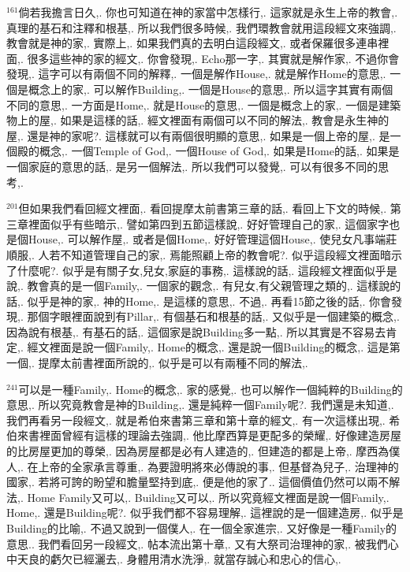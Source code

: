\documentclass{book}
\begin{document}
$^{161}$倘若我擔言日久,.
你也可知道在神的家當中怎樣行,.
這家就是永生上帝的教會,.
真理的基石和注釋和根基,.
所以我們很多時候,.
我們環教會就用這段經文來強調,.
教會就是神的家,.
實際上,.
如果我們真的去明白這段經文,.
或者保羅很多連串裡面,.
很多這些神的家的經文,.
你會發現,.
Echo那一字,.
其實就是解作家,.
不過你會發現,.
這字可以有兩個不同的解釋,.
一個是解作House,.
就是解作Home的意思,.
一個是概念上的家,.
可以解作Building,.
一個是House的意思,.
所以這字其實有兩個不同的意思,.
一方面是Home,.
就是House的意思,.
一個是概念上的家,.
一個是建築物上的屋,.
如果是這樣的話,.
經文裡面有兩個可以不同的解法,.
教會是永生神的屋,.
還是神的家呢?.
這樣就可以有兩個很明顯的意思,.
如果是一個上帝的屋,.
是一個殿的概念,.
一個Temple of God,.
一個House of God,.
如果是Home的話,.
如果是一個家庭的意思的話,.
是另一個解法,.
所以我們可以發覺,.
可以有很多不同的思考,.

$^{201}$但如果我們看回經文裡面,.
看回提摩太前書第三章的話,.
看回上下文的時候,.
第三章裡面似乎有些暗示,.
譬如第四到五節這樣說,.
好好管理自己的家,.
這個家字也是個House,.
可以解作屋,.
或者是個Home,.
好好管理這個House,.
使兒女凡事端莊順服,.
人若不知道管理自己的家,.
焉能照顧上帝的教會呢?.
似乎這段經文裡面暗示了什麼呢?.
似乎是有關子女,兒女,家庭的事務,.
這樣說的話,.
這段經文裡面似乎是說,.
教會真的是一個Family,.
一個家的觀念,.
有兒女,有父親管理之類的,.
這樣說的話,.
似乎是神的家,.
神的Home,.
是這樣的意思,.
不過,.
再看15節之後的話,.
你會發現,.
那個字眼裡面說到有Pillar,.
有個基石和根基的話,.
又似乎是一個建築的概念,.
因為說有根基,.
有基石的話,.
這個家是說Building多一點,.
所以其實是不容易去肯定,.
經文裡面是說一個Family,.
Home的概念,.
還是說一個Building的概念,.
這是第一個,.
提摩太前書裡面所說的,.
似乎是可以有兩種不同的解法,.

$^{241}$可以是一種Family,.
Home的概念,.
家的感覺,.
也可以解作一個純粹的Building的意思,.
所以究竟教會是神的Building,.
還是純粹一個Family呢?.
我們還是未知道,.
我們再看另一段經文,.
就是希伯來書第三章和第十章的經文,.
有一次這樣出現,.
希伯來書裡面曾經有這樣的理論去強調,.
他比摩西算是更配多的榮耀,.
好像建造房屋的比房屋更加的尊榮,.
因為房屋都是必有人建造的,.
但建造的都是上帝,.
摩西為僕人,.
在上帝的全家承言尊重,.
為要證明將來必傳說的事,.
但基督為兒子,.
治理神的國家,.
若將可誇的盼望和膽量堅持到底,.
便是他的家了..
這個價值仍然可以兩不解法,.
Home Family又可以,.
Building又可以,.
所以究竟經文裡面是說一個Family,.
Home,.
還是Building呢?.
似乎我們都不容易理解,.
這裡說的是一個建造房,.
似乎是Building的比喻,.
不過又說到一個僕人,.
在一個全家進宗,.
又好像是一種Family的意思..
我們看回另一段經文,.
帖本流出第十章,.
又有大祭司治理神的家,.
被我們心中天良的虧欠已經灑去,.
身體用清水洗淨,.
就當存誠心和忠心的信心,.
\end{document}
